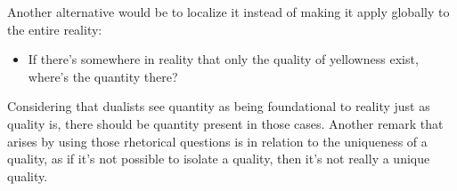 Another alternative would be to localize it instead of making it apply globally to the entire
reality:

\begin{itemize}
    \item If there's somewhere in reality that only the quality of yellowness exist, where's the
    quantity there?
\end{itemize}

Considering that dualists see quantity as being foundational to reality just as quality is, there
should be quantity present in those cases. Another remark that arises by using those rhetorical
questions is in relation to the uniqueness of a quality, as if it's not possible to isolate a
quality, then it's not really a unique quality.